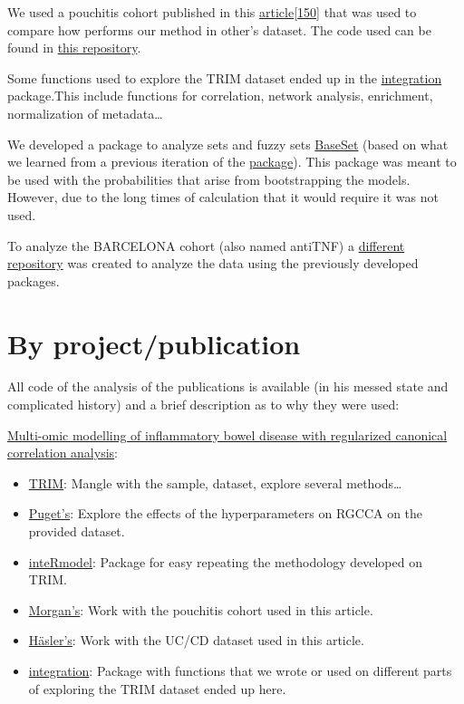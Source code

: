 \documentclass[
  12pt,
  a4paper,
  twoside,
  openright]{book}
\providecommand{\tightlist}{%
  \setlength{\itemsep}{0pt}\setlength{\parskip}{0pt}}
\begin{document}
We used a pouchitis cohort published in this \href{https://dx.doi.org/10.1186/s13059-015-0637-x}{article}{[}\protect\hyperlink{ref-morgan2015}{150}{]} that was used to compare how performs our method in other's dataset.
The code used can be found in \href{https://github.com/llrs/pouchitis}{this repository}.

Some functions used to explore the TRIM dataset ended up in the \href{https://github.com/llrs/integration-helper}{integration} package.This include functions for correlation, network analysis, enrichment, normalization of metadata\ldots{}

We developed a package to analyze sets and fuzzy sets \href{https://github.com/rOpenSci/BaseSet}{BaseSet} (based on what we learned from a previous iteration of the \href{https://github.com/llrs/GSEAdv}{package}).
This package was meant to be used with the probabilities that arise from bootstrapping the models.
However, due to the long times of calculation that it would require it was not used.

To analyze the BARCELONA cohort (also named antiTNF) a \href{https://github.com/llrs/Barcelona}{different repository} was created to analyze the data using the previously developed packages.

\hypertarget{by-projectpublication}{%
\section{By project/publication}\label{by-projectpublication}}

All code of the analysis of the publications is available (in his messed state and complicated history) and a brief description as to why they were used:

\href{https://journals.plos.org/plosone/article?id=10.1371/journal.pone.0246367}{Multi-omic modelling of inflammatory bowel disease with regularized canonical correlation analysis}:

\begin{itemize}
\tightlist
\item
  \href{https://github.com/llrs/TRIM}{TRIM}: Mangle with the sample, dataset, explore several methods\ldots{}
\item
  \href{https://github.com/llrs/sgcca_hyperparameters}{Puget's}: Explore the effects of the hyperparameters on RGCCA on the provided dataset.
\item
  \href{https://github.com/llrs/inteRmodel}{inteRmodel}: Package for easy repeating the methodology developed on TRIM.
\item
  \href{https://github.com/llrs/pouchitis}{Morgan's}: Work with the pouchitis cohort used in this article.
\item
  \href{https://github.com/llrs/Uncoupling}{Häsler's}: Work with the UC/CD dataset used in this article.
\item
  \href{https://github.com/llrs/integration-helper}{integration}: Package with functions that we wrote or used on different parts of exploring the TRIM dataset ended up here.
\end{itemize}
\end{document}
